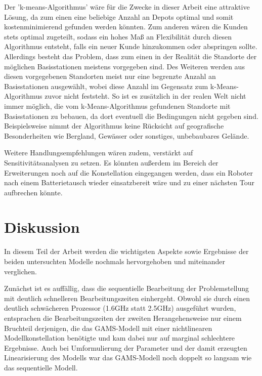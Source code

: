 \documentclass[a4paper,12pt,parskip,bibtotoc,liststotoc]{article}
\begin{document}
Der 'k-means-Algorithmus' wäre für die Zwecke in dieser Arbeit eine attraktive Lösung, da zum einen eine beliebige Anzahl an Depots optimal und somit kostenminimierend gefunden werden könnten.
Zum anderen wären die Kunden stets optimal zugeteilt, sodass ein hohes Maß an Flexibilität durch diesen Algorithmus entsteht, falls ein neuer Kunde hinzukommen oder abspringen sollte.
Allerdings besteht das Problem, dass zum einen in der Realität die Standorte der möglichen Basisstationen meistens vorgegeben sind.
Des Weiteren werden aus diesen vorgegebenen Standorten meist nur eine begrenzte Anzahl an Basisstationen ausgewählt, wobei diese Anzahl im Gegensatz zum k-Means-Algorithmus zuvor nicht feststeht. 
So ist es zusätzlich in der realen Welt nicht immer möglich, die vom k-Means-Algorithmus gefundenen Standorte mit Basisstationen zu bebauen, da dort eventuell die Bedingungen nicht gegeben sind.
Beispielsweise nimmt der Algorithmus keine Rücksicht auf geografische Besonderheiten wie Bergland, Gewässer oder sonstiges, unbebaubares Gelände.

Weitere Handlungsempfehlungen wären zudem, verstärkt auf Sensitivitätsanalysen zu setzen. 
Es könnten außerdem im Bereich der Erweiterungen noch auf die Konstellation eingegangen werden, dass ein Roboter nach einem Batterietausch wieder einsatzbereit wäre und zu einer nächsten Tour aufbrechen könnte.




\newpage
\section{Diskussion}

In diesem Teil der Arbeit werden die wichtigsten Aspekte sowie Ergebnisse der beiden untersuchten Modelle nochmals hervorgehoben und miteinander verglichen.

Zunächst ist es auffällig, dass die sequentielle Bearbeitung der Problemstellung mit deutlich schnelleren Bearbeitungszeiten einhergeht.
Obwohl sie durch einen deutlich schwächeren Prozessor (1.6GHz statt 2.5GHz) ausgeführt wurden, entsprachen die Bearbeitungszeiten der zweiten Herangehensweise nur einem Bruchteil derjenigen, die das GAMS-Modell mit einer nichtlinearen Modellkonstellation benötigte und kam dabei nur auf marginal schlechtere Ergebnisse.
Auch bei Umformulierung der Parameter und der damit erzeugten Linearisierung des Modells war das GAMS-Modell noch doppelt so langsam wie das sequentielle Modell.
\end{document}
